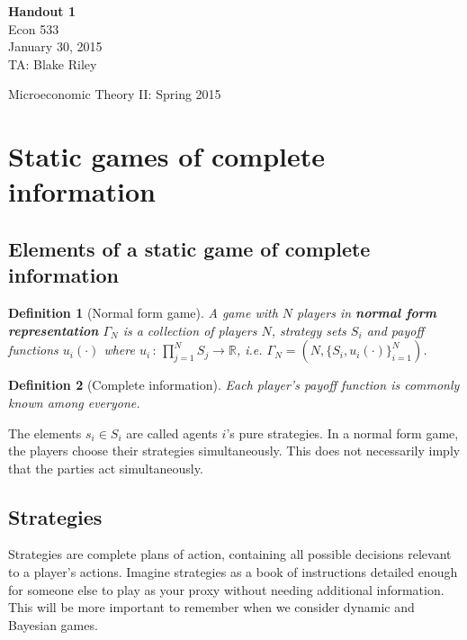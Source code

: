 \documentclass[letter, 11pt]{article}
\theoremstyle{basic}
\newtheorem{definition}{Definition}[section]
\newcommand{\R}{\mathbb{R}}
\begin{document}
\begin{spacing}{1.0}

\noindent
\textbf{Handout 1} \\
Econ 533 \\
January 30, 2015 \\
TA: Blake Riley \\

\begin{center}
{\Large Microeconomic Theory II: Spring 2015}
\end{center}

\section{Static games of complete information}

\subsection{Elements of a static game of complete
  information}

\begin{definition}[Normal form game]
  A game with $N$ players in \textbf{normal form
    representation} $\Gamma_N$ is a collection of players
    $N$, strategy sets $S_i$ and payoff functions
    $u_i(\cdot)$ where $u_i \,:\, \prod_{j=1}^N S_j \to
    \R$, i.e. $\Gamma_N = \left(N, \{S_i, u_i(\cdot)\}_{i=1}^N\right)$.
\end{definition}

\begin{definition}[Complete information]
  Each player's payoff function is commonly known among everyone.
\end{definition}

The elements $s_i \in S_i$ are called agents $i$'s pure strategies. In a
normal form game, the players choose their strategies simultaneously. This
does not necessarily imply that the parties act simultaneously.

\subsection{Strategies}

Strategies are complete plans of action, containing all possible decisions
relevant to a player's actions. Imagine strategies as a book of
instructions detailed enough for someone else to play as your proxy without
needing additional information. This will be more important to remember
when we consider dynamic and Bayesian games.


\end{spacing}
\end{document}
